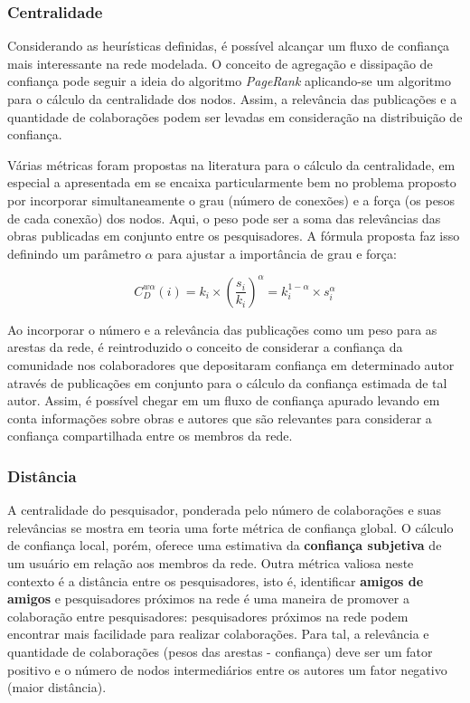 \documentclass[12pt]{article}
\begin{document}
\subsubsection{Centralidade}

Considerando as heurísticas definidas, é possível alcançar um fluxo de confiança mais interessante na rede modelada. O conceito 
de agregação e dissipação de confiança pode seguir a ideia do algoritmo \textit{PageRank} aplicando-se um algoritmo para o 
cálculo da centralidade dos nodos. Assim, a relevância das publicações e a quantidade de colaborações podem ser levadas em 
consideração na distribuição de confiança.

Várias métricas foram propostas na literatura para o cálculo da centralidade, em especial a apresentada em \cite{opsahl2010node} 
se encaixa particularmente bem no problema proposto por incorporar simultaneamente o grau (número de conexões) e a força 
(os pesos de cada conexão) dos nodos. Aqui, o peso pode ser a soma das relevâncias das obras publicadas em conjunto entre os 
pesquisadores. A fórmula proposta faz isso definindo um parâmetro $\alpha$ para ajustar a importância de grau e força:

\begin{equation} \label{eqn:centrality} 
 C_D ^{w \alpha} (i) = k_i \times \left( \frac {s_i} {k_i} \right) ^{\alpha} = k_i ^{1 - \alpha} \times s _i ^{\alpha}
\end{equation}

Ao incorporar o número e a relevância das publicações como um peso para as arestas da rede, é reintroduzido o conceito de 
considerar a confiança da comunidade nos colaboradores que depositaram confiança em determinado autor através de publicações 
em  conjunto para o cálculo da confiança estimada de tal autor. Assim, é possível chegar em um fluxo de confiança apurado 
levando em conta informações sobre obras e autores que são relevantes para considerar a confiança compartilhada entre 
os membros da rede.

\subsubsection{Distância} \label{sect:distance}

A centralidade do pesquisador, ponderada pelo número de colaborações e suas relevâncias se mostra em teoria uma forte métrica de 
confiança global. O cálculo de confiança local, porém, oferece uma estimativa da \textbf{confiança subjetiva} de um usuário em 
relação aos membros da rede. Outra métrica valiosa neste contexto é a distância entre os pesquisadores, isto é, identificar 
\textbf{amigos de amigos} e pesquisadores próximos na rede é uma maneira de promover a colaboração entre pesquisadores: 
pesquisadores próximos na rede podem encontrar mais facilidade para realizar colaborações. Para tal, a relevância e quantidade de 
colaborações (pesos das arestas - confiança) deve ser um fator positivo e o número de nodos intermediários entre os autores um 
fator negativo (maior distância).
\end{document}
